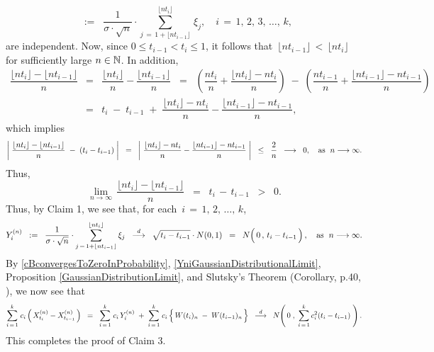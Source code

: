 \begin{enumerate}
\begin{equation*}
		\;\; := \;\;
		\dfrac{1}{\sigma\cdot\sqrt{n}}
		\cdot
		\overset{\lfloor nt_{i} \rfloor}{\underset{j\,=\,1+\lfloor nt_{i-1} \rfloor}{\sum}}\,\xi_{j},
		\quad
		i \,=\, 1,\, 2,\, 3,\, \ldots,\, k,
		\end{equation*}
		are independent.
		Now, since $0 \leq t_{i-1} < t_{i} \leq 1$, it follows that
		\,$\lfloor nt_{i-1} \rfloor \,<\, \lfloor nt_{i} \rfloor$\,
		for sufficiently large $n \in \mathbb{N}$.
		In addition,
		\begin{eqnarray*}
		\dfrac{\lfloor n t_{i} \rfloor - \lfloor n t_{i-1} \rfloor}{n}
		& = & \dfrac{\lfloor n t_{i} \rfloor}{n} - \dfrac{\lfloor n t_{i-1} \rfloor}{n}
		\;\; = \;\; \left(\dfrac{n t_{i}}{n} + \dfrac{\lfloor n t_{i} \rfloor - n t_{i}}{n}\right)
			\;-\; \left(\dfrac{n t_{i-1}}{n} + \dfrac{\lfloor n t_{i-1} \rfloor - n t_{i-1}}{n}\right)
		\\
		&=& t_{i} \;-\; t_{i-1} \;+\;  \dfrac{\lfloor nt_{i} \rfloor - nt_{i}}{n} - \dfrac{\lfloor nt_{i-1} \rfloor - nt_{i-1}}{n},
		\end{eqnarray*}
		which implies
		\begin{equation*}
		\left\vert\; \dfrac{\lfloor n t_{i} \rfloor - \lfloor n t_{i-1} \rfloor}{n} \;-\; (t_{i}-t_{i-1}) \;\right\vert
		\;\;=\;\;
		\left\vert\; \dfrac{\lfloor nt_{i} \rfloor - nt_{i}}{n} - \dfrac{\lfloor nt_{i-1} \rfloor - nt_{i-1}}{n} \;\right\vert
		\;\; \leq \;\;
		\dfrac{2}{n}
		\;\; \longrightarrow \;\; 0,
		\quad
		\textnormal{as \;$n \longrightarrow \infty$}.
		\end{equation*}
		Thus,
		\begin{equation*}
		\lim_{n\rightarrow\infty}\,\dfrac{\lfloor n t_{i} \rfloor - \lfloor n t_{i-1} \rfloor}{n} \;\;=\;\; t_{i} \,-\, t_{i-1} \;\;>\;\; 0.
		\end{equation*}
		Thus, by Claim 1, we see that, for each \,$i \,=\, 1,\, 2,\, \ldots,\, k$,
		\begin{equation}\label{YniGaussianDistributionalLimit}
		Y^{(n)}_{i}
		\;\; := \;\;
		\dfrac{1}{\sigma\cdot\sqrt{n}}
		\cdot
		\overset{\lfloor nt_{i} \rfloor}{\underset{j\,=\,1+\lfloor nt_{i-1} \rfloor}{\sum}}\,\xi_{j}
		\;\; \overset{d}{\longrightarrow} \;\; \sqrt{t_{i}-t_{i-1}} \cdot N(0,1)
		\;\; = \;\; N\!\left(\,\overset{{\color{white}.}}{0}\,,\,t_{i}-t_{i-1}\,\right),
		\quad
		\textnormal{as \;$n \longrightarrow \infty$}.
		\end{equation}
		By \eqref{cBconvergesToZeroInProbability},
		\eqref{YniGaussianDistributionalLimit},
		Proposition \ref{GaussianDistributionLimit},
		and Slutsky's Theorem (Corollary, p.40, \cite{Ferguson1996}), we now see that
		\begin{equation*}
		\overset{k}{\underset{i\,=\,1}{\sum}} \; c_{i}\left(\,X^{(n)}_{t_{i}} - X^{(n)}_{t_{i-1}}\,\right)
		\;\;=\;\;
		\overset{k}{\underset{i\,=\,1}{\sum}} \; c_{i}\,Y^{(n)}_{i}
		\;+\;
		\overset{k}{\underset{i\,=\,1}{\sum}} \; c_{i} \left\{\,\overset{{\color{white}.}}{W}(t_{i})_{n} \;-\; W(t_{i-1})_{n}\,\right\}
		\;\;\overset{d}{\longrightarrow}\;\;
		N\!\left(\,0\;,\;\sum_{i\,=\,1}^{k}c_{i}^{2}(t_{i}-t_{i-1})\;\right).
		\end{equation*}		
		This completes the proof of Claim 3.


\end{enumerate}
